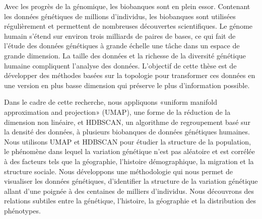 Avec les progrès de la génomique, les biobanques sont en plein essor. Contenant les données génétiques de millions d'individus, les biobanques sont utilisées régulièrement et permettent de nombreuses découvertes scientifiques. Le génome humain s'étend sur environ trois milliards de paires de bases, ce qui fait de l'étude des données génétiques à grande échelle une tâche dans un espace de grande dimension. La taille des données et la richesse de la diversité génétique humaine compliquent l'analyse des données. L'objectif de cette thèse est de développer des méthodes basées sur la topologie pour transformer ces données en une version en plus basse dimension qui préserve le plus d'information possible. 

Dans le cadre de cette recherche, nous appliquons «uniform manifold approximation and projection» (UMAP), une forme de la réduction de la dimension non linéaire, et HDBSCAN, un algorithme de regroupement basé sur la densité des données, à plusieurs biobanques de données génétiques humaines. Nous utilisons UMAP et HDBSCAN pour étudier la structure de la population, le phénomène dans lequel la variation génétique n'est pas aléatoire et est corrélée à des facteurs tels que la géographie, l'histoire démographique, la migration et la structure sociale. Nous développons une méthodologie qui nous permet de visualiser les données génétiques, d'identifier la structure de la variation génétique allant d'une poignée à des centaines de milliers d'individus. Nous découvrons des relations subtiles entre la génétique, l'histoire, la géographie et la distribution des phénotypes.